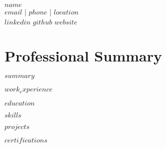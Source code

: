 \documentclass[11pt,a4paper]{article}
\begin{document}
\begin{center}
{\Huge\bfseries $name$}\\
\vspace{0.2cm}
$email$ | $phone$ | $location$\\
\vspace{0.1cm}
$linkedin$ $github$ $website$
\end{center}

\vspace{0.5cm}

\section{Professional Summary}
$summary$

$work_experience$

$education$

$skills$

$projects$

$certifications$
\end{document}
